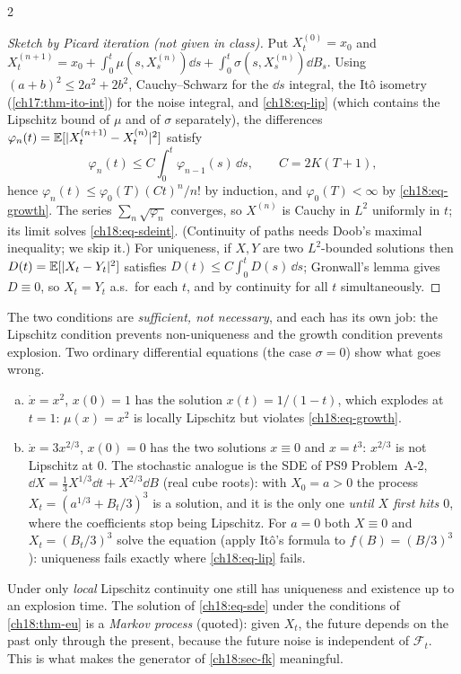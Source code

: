 \begin{paracol}{2}
\begin{proof}[Sketch by Picard iteration (not given in class)]
Put $X^{(0)}_t=x_0$ and $X^{(n+1)}_t=x_0+\int_0^t\mu(s,X^{(n)}_s)\dd s+\int_0^t\sigma(s,X^{(n)}_s)\dd B_s$. Using $(a+b)^2\le2a^2+2b^2$, Cauchy--Schwarz for the $\dd s$ integral, the It\^o isometry (\cref{ch17:thm-ito-int}) for the noise integral, and \eqref{ch18:eq-lip} (which contains the Lipschitz bound of $\mu$ and of $\sigma$ separately), the differences $\varphi_n(t)=\mathbb{E}[|X^{(n+1)}_t-X^{(n)}_t|^2]$ satisfy
\[
  \varphi_n(t)\le C\int_0^t\varphi_{n-1}(s)\,\dd s,\qquad C=2K(T+1),
\]
hence $\varphi_n(t)\le\varphi_0(T)(Ct)^n/n!$ by induction, and $\varphi_0(T)<\infty$ by \eqref{ch18:eq-growth}. The series $\sum_n\sqrt{\varphi_n}$ converges, so $X^{(n)}$ is Cauchy in $L^2$ uniformly in $t$; its limit solves \eqref{ch18:eq-sdeint}. (Continuity of paths needs Doob's maximal inequality; we skip it.) For uniqueness, if $X,Y$ are two $L^2$-bounded solutions then $D(t)=\mathbb{E}[|X_t-Y_t|^2]$ satisfies $D(t)\le C\int_0^tD(s)\,\dd s$; Gronwall's lemma gives $D\equiv0$, so $X_t=Y_t$ a.s.\ for each $t$, and by continuity for all $t$ simultaneously.
\end{proof}
The two conditions are \emph{sufficient, not necessary}, and each has its own job: the Lipschitz condition prevents non-uniqueness and the growth condition prevents explosion. Two ordinary differential equations (the case $\sigma=0$) show what goes wrong.
\begin{example}\label{ch18:ex-fail}
\leavevmode
\begin{enumerate}[(a)]
  \item $\dot x=x^2$, $x(0)=1$ has the solution $x(t)=1/(1-t)$, which explodes at $t=1$: $\mu(x)=x^2$ is locally Lipschitz but violates \eqref{ch18:eq-growth}.
  \item $\dot x=3x^{2/3}$, $x(0)=0$ has the two solutions $x\equiv0$ and $x=t^3$: $x^{2/3}$ is not Lipschitz at $0$. The stochastic analogue is the SDE of PS9 Problem~A-2, $\dd X=\tfrac13X^{1/3}\dd t+X^{2/3}\dd B$ (real cube roots): with $X_0=a>0$ the process $X_t=(a^{1/3}+B_t/3)^3$ is a solution, and it is the only one \emph{until $X$ first hits $0$}, where the coefficients stop being Lipschitz. For $a=0$ both $X\equiv0$ and $X_t=(B_t/3)^3$ solve the equation (apply It\^o's formula to $f(B)=(B/3)^3$): uniqueness fails exactly where \eqref{ch18:eq-lip} fails.
\end{enumerate}
\end{example}
Under only \emph{local} Lipschitz continuity one still has uniqueness and existence up to an explosion time. The solution of \eqref{ch18:eq-sde} under the conditions of \cref{ch18:thm-eu} is a \emph{Markov process} (quoted): given $X_t$, the future depends on the past only through the present, because the future noise is independent of $\mathcal F_t$. This is what makes the generator of \cref{ch18:sec-fk} meaningful.


\end{paracol}
